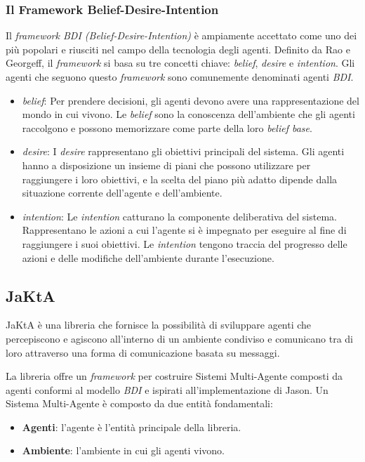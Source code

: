 \subsubsection{Il Framework Belief-Desire-Intention}
Il \textit{framework BDI (Belief-Desire-Intention)} è ampiamente accettato come uno dei più popolari e riusciti nel campo della tecnologia degli agenti. Definito da Rao e Georgeff, il \textit{framework} si basa su tre concetti chiave: \textit{belief}, \textit{desire} e \textit{intention}. Gli agenti che seguono questo \textit{framework} sono comunemente denominati agenti \textit{BDI}.

\begin{itemize}
    \item \textit{belief}: Per prendere decisioni, gli agenti devono avere una rappresentazione del mondo in cui vivono. Le \textit{belief} sono la conoscenza dell'ambiente che gli agenti raccolgono e possono memorizzare come parte della loro \textit{belief base}.
    \item \textit{desire}: I \textit{desire} rappresentano gli obiettivi principali del sistema. Gli agenti hanno a disposizione un insieme di piani che possono utilizzare per raggiungere i loro obiettivi, e la scelta del piano più adatto dipende dalla situazione corrente dell'agente e dell'ambiente.
    \item \textit{intention}: Le \textit{intention} catturano la componente deliberativa del sistema. Rappresentano le azioni a cui l'agente si è impegnato per eseguire al fine di raggiungere i suoi obiettivi. Le \textit{intention} tengono traccia del progresso delle azioni e delle modifiche dell'ambiente durante l'esecuzione.
\end{itemize}

\subsection{JaKtA}
JaKtA\cite{10.1007/978-3-031-43264-4_4} è una libreria che fornisce la possibilità di sviluppare agenti che percepiscono e agiscono all'interno di un ambiente condiviso e comunicano tra di loro attraverso una forma di comunicazione basata su messaggi.

La libreria offre un \textit{framework} per costruire Sistemi Multi-Agente composti da agenti conformi al modello \textit{BDI} e ispirati all'implementazione di Jason\cite{Bordini2005}. Un Sistema Multi-Agente è composto da due entità fondamentali:

\begin{itemize}
    \item \textbf{Agenti}: l'agente è l'entità principale della libreria.
    \item \textbf{Ambiente}: l'ambiente in cui gli agenti vivono.
\end{itemize}

